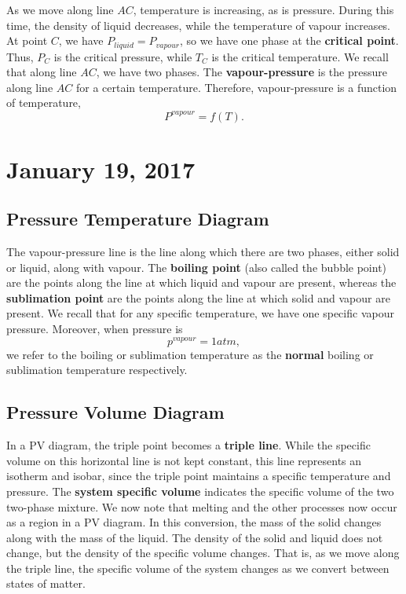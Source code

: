 \documentclass[11pt]{article}
\theoremstyle{plain} %
\theoremstyle{definition}
\theoremstyle{example}
\theoremstyle{remark}
\begin{document}
As we move along line $AC$, temperature is increasing, as is pressure. During this time, the density of liquid decreases, while the temperature of vapour increases. At point $C$, we have $P_{liquid} = P_{vapour}$, so we have  one phase at the \textbf{critical point}.  Thus, $P_C$ is the critical pressure, while $T_C$ is the critical temperature. 
We recall that along line $AC$, we have two phases. The \textbf{vapour-pressure} is the pressure along line $AC$ for a certain temperature. Therefore, vapour-pressure is a function of temperature, $$P^{vapour}  = f(T).$$

\section{January 19, 2017}
\subsection{Pressure Temperature Diagram} 

The vapour-pressure line is the line along which there are two phases, either solid or liquid, along with vapour. The \textbf{boiling point} (also called the bubble point) are the points along the line at which liquid and vapour are present, whereas the \textbf{sublimation point} are the points along the line at which solid and vapour are present. We recall that for any specific temperature, we have one specific vapour pressure. Moreover, when pressure is 
$$p^{vapour} = 1atm,$$
we refer to the boiling or sublimation temperature as the \textbf{normal} boiling or sublimation temperature respectively. 

\subsection{Pressure Volume Diagram}

In a PV diagram, the triple point becomes a \textbf{triple line}. While the specific volume on this horizontal line is not kept constant, this line represents an isotherm and isobar, since the triple point maintains a specific temperature and pressure. The \textbf{system specific volume} indicates the specific volume of the two two-phase mixture. We now note that melting and the other processes now occur as a region in a PV diagram. In this conversion, the mass of the solid changes along with the mass of the liquid. The density of the solid and liquid does not change, but the density of the specific volume changes. That is, as we move along the triple line, the specific volume of the system changes as we convert between states of matter. 
\end{document}
